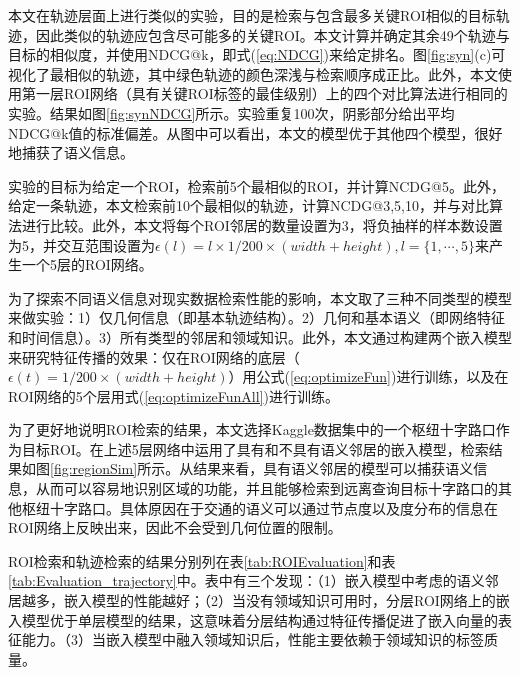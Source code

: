 本文在轨迹层面上进行类似的实验，目的是检索与包含最多关键ROI相似的目标轨迹，因此类似的轨迹应包含尽可能多的关键ROI。本文计算并确定其余49个轨迹与目标的相似度，并使用NDCG@k，即式(\ref{eq:NDCG})来给定排名。图\ref{fig:syn}(c)可视化了最相似的轨迹，其中绿色轨迹的颜色深浅与检索顺序成正比。此外，本文使用第一层ROI网络（具有关键ROI标签的最佳级别）上的四个对比算法进行相同的实验。结果如图\ref{fig:synNDCG}所示。实验重复100次，阴影部分给出平均NDCG@k值的标准偏差。从图中可以看出，本文的模型优于其他四个模型，很好地捕获了语义信息。





实验的目标为给定一个ROI，检索前5个最相似的ROI，并计算NCDG@5。此外，给定一条轨迹，本文检索前10个最相似的轨迹，计算NCDG@3,5,10，并与对比算法进行比较。此外，本文将每个ROI邻居的数量设置为3，将负抽样的样本数设置为5，并交互范围设置为$\epsilon(l) = l \times 1/200\times(width + height), l = \{1,\cdots,5\}$来产生一个5层的ROI网络。

为了探索不同语义信息对现实数据检索性能的影响，本文取了三种不同类型的模型来做实验：1）仅几何信息（即基本轨迹结构）。2）几何和基本语义（即网络特征和时间信息）。3）所有类型的邻居和领域知识。此外，本文通过构建两个嵌入模型来研究特征传播的效果：仅在ROI网络的底层（$\epsilon(t) = 1/200 \times(width + height)$）用公式(\ref{eq:optimizeFun})进行训练，以及在ROI网络的5个层用式(\ref{eq:optimizeFunAll})进行训练。

为了更好地说明ROI检索的结果，本文选择Kaggle数据集中的一个枢纽十字路口作为目标ROI。在上述5层网络中运用了具有和不具有语义邻居的嵌入模型，检索结果如图\ref{fig:regionSim}所示。从结果来看，具有语义邻居的模型可以捕获语义信息，从而可以容易地识别区域的功能，并且能够检索到远离查询目标十字路口的其他枢纽十字路口。具体原因在于交通的语义可以通过节点度以及度分布的信息在ROI网络上反映出来，因此不会受到几何位置的限制。

ROI检索和轨迹检索的结果分别列在表\ref{tab:ROIEvaluation}和表\ref{tab:Evaluation_trajectory}中。表中有三个发现：（1）嵌入模型中考虑的语义邻居越多，嵌入模型的性能越好；（2）当没有领域知识可用时，分层ROI网络上的嵌入模型优于单层模型的结果，这意味着分层结构通过特征传播促进了嵌入向量的表征能力。（3）当嵌入模型中融入领域知识后，性能主要依赖于领域知识的标签质量。


